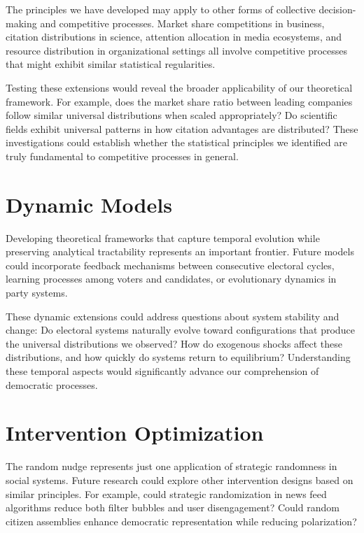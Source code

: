 The principles we have developed may apply to other forms of collective decision-making and competitive processes. Market share competitions in business, citation distributions in science, attention allocation in media ecosystems, and resource distribution in organizational settings all involve competitive processes that might exhibit similar statistical regularities.

Testing these extensions would reveal the broader applicability of our theoretical framework. For example, does the market share ratio between leading companies follow similar universal distributions when scaled appropriately? Do scientific fields exhibit universal patterns in how citation advantages are distributed? These investigations could establish whether the statistical principles we identified are truly fundamental to competitive processes in general.

\section{Dynamic Models}

Developing theoretical frameworks that capture temporal evolution while preserving analytical tractability represents an important frontier. Future models could incorporate feedback mechanisms between consecutive electoral cycles, learning processes among voters and candidates, or evolutionary dynamics in party systems.

These dynamic extensions could address questions about system stability and change: Do electoral systems naturally evolve toward configurations that produce the universal distributions we observed? How do exogenous shocks affect these distributions, and how quickly do systems return to equilibrium? Understanding these temporal aspects would significantly advance our comprehension of democratic processes.

\section{Intervention Optimization}

The random nudge represents just one application of strategic randomness in social systems. Future research could explore other intervention designs based on similar principles. For example, could strategic randomization in news feed algorithms reduce both filter bubbles and user disengagement? Could random citizen assemblies enhance democratic representation while reducing polarization?

